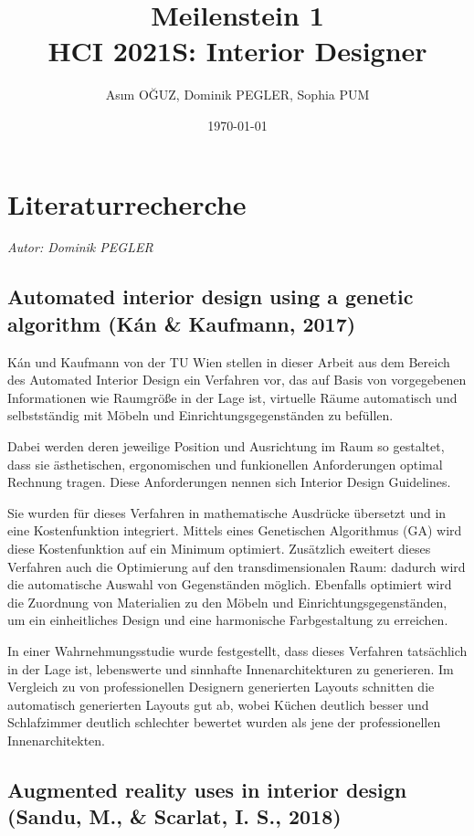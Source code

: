 \documentclass[12pt,paper=a4,oneside,hidelinks,headings=small,captions=heading,captions=nooneline]{scrartcl}
\author{Asım OĞUZ, Dominik PEGLER, Sophia PUM}
\date{\today}
\title{Meilenstein 1\\\medskip
\large HCI 2021S: Interior Designer}
\begin{document}
\maketitle
\setcounter{tocdepth}{2}
\tableofcontents\newpage

\section{Literaturrecherche}
\label{sec:org7538986}
\emph{Autor: Dominik PEGLER}
\subsection{Automated interior design using a genetic algorithm (Kán \& Kaufmann, 2017)}
\label{sec:orga6b8437}

Kán und Kaufmann von der TU Wien stellen in dieser Arbeit aus dem
Bereich des Automated Interior Design ein Verfahren vor, das auf Basis
von vorgegebenen Informationen wie Raumgröße in der Lage ist,
virtuelle Räume automatisch und selbstständig mit Möbeln und
Einrichtungsgegenständen zu befüllen.

Dabei werden deren jeweilige Position und Ausrichtung im Raum so
gestaltet, dass sie ästhetischen, ergonomischen und funkionellen
Anforderungen optimal Rechnung tragen. Diese Anforderungen nennen sich
Interior Design Guidelines.

Sie wurden für dieses Verfahren in mathematische Ausdrücke übersetzt
und in eine Kostenfunktion integriert. Mittels eines Genetischen
Algorithmus (GA) wird diese Kostenfunktion auf ein Minimum
optimiert. Zusätzlich eweitert dieses Verfahren auch die Optimierung
auf den transdimensionalen Raum: dadurch wird die automatische Auswahl
von Gegenständen möglich. Ebenfalls optimiert wird die Zuordnung von
Materialien zu den Möbeln und Einrichtungsgegenständen, um ein
einheitliches Design und eine harmonische Farbgestaltung zu
erreichen.

In einer Wahrnehmungsstudie wurde festgestellt, dass dieses Verfahren
tatsächlich in der Lage ist, lebenswerte und sinnhafte
Innenarchitekturen zu generieren. Im Vergleich zu von professionellen
Designern generierten Layouts schnitten die automatisch generierten
Layouts gut ab, wobei Küchen deutlich besser und Schlafzimmer deutlich
schlechter bewertet wurden als jene der professionellen
Innenarchitekten.

\subsection{Augmented reality uses in interior design (Sandu, M., \& Scarlat, I. S., 2018)}
\label{sec:org1e811a6}
\end{document}
